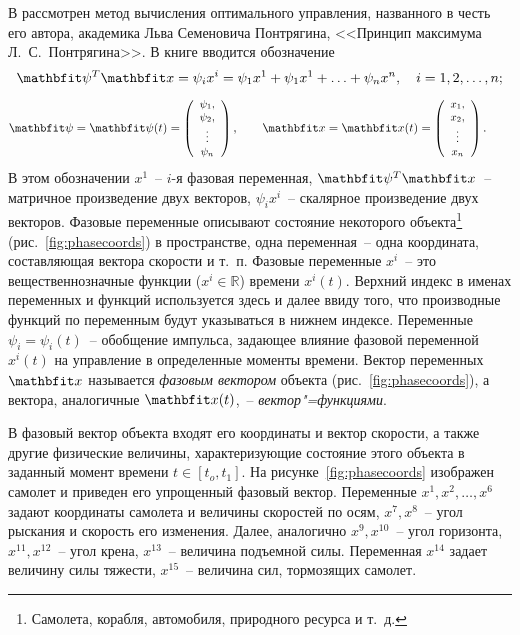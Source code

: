 \documentclass[a4paper,14pt, openany, twoside, draft]{extbook} %
\begin{document}
В \cite{pontr} рассмотрен метод вычисления оптимального управления, названного в честь его автора, академика Льва Семеновича Понтрягина, <<Принцип максимума Л.~С.~Понтрягина>>.  В книге вводится обозначение
$$
\vecpsi^T\vecx=\psi_ix^i=\psi_1x^1+\psi_1x^1+\ldots +\psi_nx^n,\quad i=1,2,\ldots,n;
$$
$$
\vecpsi=\vecpsi(t)=\left({\small
  \begin{array}{c}
    \psi_1,\\ \psi_2,\\ \vdots\\ \psi_n
  \end{array}}
\right),\qquad\vecx=\vecx(t)=\left({\small
  \begin{array}{c}
    x_1,\\ x_2,\\ \vdots\\ x_n
  \end{array}}
\right).\qquad
$$
В этом обозначении $x^1$~-- $i$-я фазовая переменная, $\vecpsi^T\vecx$~-- матричное произведение двух векторов, $\psi_ix^i$~-- скалярное произведение двух векторов.  Фазовые переменные описывают состояние некоторого объекта\footnote{Самолета, корабля, автомобиля, природного ресурса и т.~д.} (рис.~\ref{fig:phasecoords}) в пространстве, одна переменная~-- одна координата, составляющая вектора скорости и т.~п.  Фазовые переменные $x^i$~-- это вещественнозначные функции ($x^i\in\mathbb{R}$) времени $x^i(t)$.  Верхний индекс в именах переменных и функций используется здесь и далее ввиду того, что производные функций по переменным будут указываться в нижнем индексе.  Переменные $\psi_i=\psi_i(t)$~-- обобщение импульса, задающее влияние фазовой переменной $x^i(t)$ на управление в определенные моменты времени.  Вектор переменных $\vecx$ называется \emph{фазовым вектором} объекта (рис.~\ref{fig:phasecoords}), а вектора, аналогичные $\vecx(t)$,~-- \emph{вектор"=функциями}.

В фазовый вектор объекта входят его координаты и вектор скорости, а также другие физические величины, характеризующие состояние этого объекта в заданный момент времени $t\in[t_o,t_1]$.  На рисунке~\ref{fig:phasecoords} изображен самолет и приведен его упрощенный фазовый вектор.  Переменные $x^1,x^2,\ldots,x^6$ задают координаты самолета и величины скоростей по осям, $x^7,x^8$~-- угол рыскания и скорость его изменения.  Далее, аналогично $x^9,x^{10}$~-- угол горизонта, $x^{11},x^{12}$~-- угол крена, $x^{13}$~-- величина подъемной силы.  Переменная $x^{14}$ задает величину силы тяжести, $x^{15}$~-- величина сил, тормозящих самолет.
\end{document}
